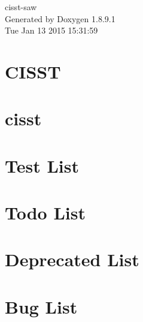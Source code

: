 \documentclass[twoside]{book}
\newcommand{\+}{\discretionary{\mbox{\scriptsize$\hookleftarrow$}}{}{}}
\newcommand{\clearemptydoublepage}{%
  \newpage{\pagestyle{empty}\cleardoublepage}%
}
\begin{document}
\hypersetup{pageanchor=false,
             bookmarks=true,
             bookmarksnumbered=true,
             pdfencoding=unicode
            }
\begin{titlepage}
\vspace*{7cm}
\begin{center}%
{\Large cisst-\/saw }\\
\vspace*{1cm}
{\large Generated by Doxygen 1.8.9.1}\\
\vspace*{0.5cm}
{\small Tue Jan 13 2015 15:31:59}\\
\end{center}
\end{titlepage}
\clearemptydoublepage
\tableofcontents
\clearemptydoublepage
{}
\hypersetup{pageanchor=true}

\chapter{C\+I\+S\+S\+T}
\label{index}\hypertarget{index}{}
\chapter{cisst}
\label{df/de1/md___users_anton_devel_cisst-saw_cisst__r_e_a_d_m_e}
\hypertarget{df/de1/md___users_anton_devel_cisst-saw_cisst__r_e_a_d_m_e}{}

\chapter{Test List}
\label{d4/df6/test}
\hypertarget{d4/df6/test}{}

\chapter{Todo List}
\label{dd/da0/todo}
\hypertarget{dd/da0/todo}{}

\chapter{Deprecated List}
\label{da/d58/deprecated}
\hypertarget{da/d58/deprecated}{}

\chapter{Bug List}
\label{de/da5/bug}
\hypertarget{de/da5/bug}{}

\end{document}

